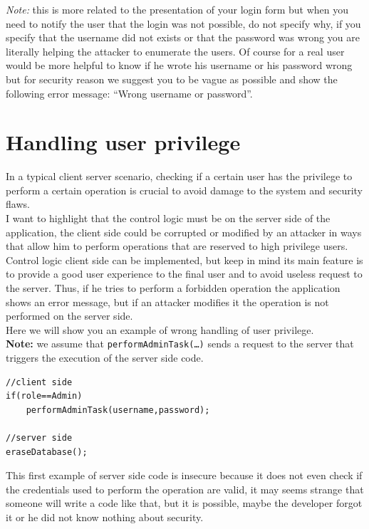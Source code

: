 \emph{Note:} this is more related to the presentation of your login form but when you need to notify the user that the login was not possible, do not specify why, if you specify that the username did not exists or that the password was wrong you are literally helping the attacker to enumerate the users. Of course for a real user would be more helpful to know if he wrote his username or his password wrong  but for security reason we suggest you to be vague as possible and show the following error message: ``Wrong username or password''.

\section{Handling user privilege}
In a typical client server scenario, checking if a certain user has the privilege to perform a certain operation is crucial to avoid damage to the system and security flaws.\\

I want to highlight that the control logic must be on the server side of the application, the client side could be corrupted or modified by an attacker in ways that allow him to perform operations that are reserved to high privilege users.\\

Control logic client side can be implemented, but keep in mind its main feature is to provide a good user experience to the final user and to avoid useless request to the server. Thus, if he tries to perform a forbidden operation the application shows an error message, but if an attacker modifies it the operation is not performed on the server side.\\

Here we will show you an example of wrong handling of user privilege.\\
\textbf{Note:} we assume that \texttt{performAdminTask(…)} sends a request to the server that triggers the execution of the server side code.

\begin{lstlisting}
//client side
if(role==Admin)
	performAdminTask(username,password);

//server side
eraseDatabase();
\end{lstlisting}

This first example of server side code is insecure because it does not even check if the credentials used to perform the operation are valid, it may seems strange that someone will write a code like that, but it is possible, maybe the developer forgot it or he did not know nothing about security.\\

